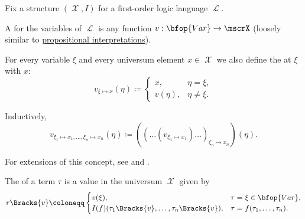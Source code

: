 \begin{definition}\label{def:first_order_valuation}
  Fix a structure \( (\mscrX, I) \) for a first-order logic language \( \mscrL \).

  \begin{defenum}
     A  for the variables of \( \mscrL \) is any function \( v: \bfop{Var} \to \mscrX \) (loosely similar to \hyperref[def:propositional_valuation/interpretation]{propositional interpretations}).

     For every variable \( \xi \) and every universum element \( x \in \mscrX \) we also define the  at \( \xi \) with \( x \):
    \begin{equation*}
      v_{\xi \mapsto x}(\eta) \coloneqq \begin{cases}
        x,       &\eta = \xi, \\
        v(\eta), &\eta \neq \xi.
      \end{cases}
    \end{equation*}

    Inductively\IND,
    \begin{equation*}
      v_{\xi_1 \mapsto x_1, \ldots, \xi_n \mapsto x_n}(\eta) \coloneqq ((\ldots(v_{\xi_1 \mapsto x_1})\ldots)_{\xi_n \mapsto x_n})(\eta).
    \end{equation*}

    For extensions of this concept, see  and .

     The  of a term \( \tau \) is a value in the universum \( \mscrX \) given by
    \begin{equation}\label{eq:def:first_order_valuation/term_valuation}
      \tau\Bracks{v} \coloneqq \begin{cases}
        v(\xi),                                     &\tau = \xi \in \bfop{Var}, \\
        I(f)(\tau_1\Bracks{v}, \ldots, \tau_n\Bracks{v}), &\tau = f(\tau_1, \ldots, \tau_n).
      \end{cases}
    \end{equation}


\end{defenum}
\end{definition}
